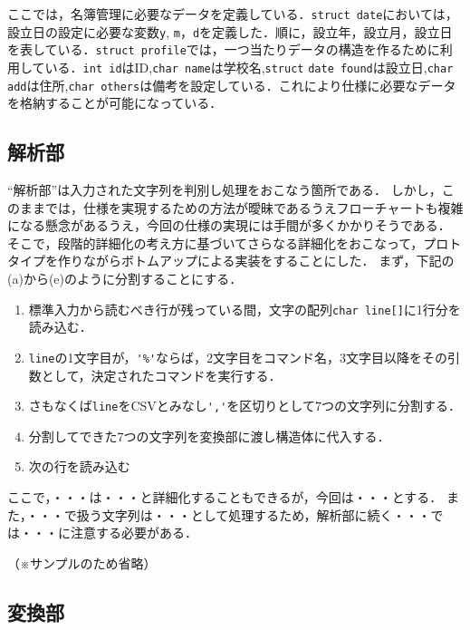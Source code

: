 \documentclass[a4j,11pt]{jarticle}
\begin{document}
ここでは，名簿管理に必要なデータを定義している．\verb|struct date|においては，設立日の設定に必要な変数\verb|y|, \verb|m|，\verb|d|を定義した．順に，設立年，設立月，設立日を表している．\verb|struct profile|では，一つ当たりデータの構造を作るために利用している．\verb|int id|はID,\verb|char name|は学校名,\verb|struct| \verb|date found|は設立日,\verb|char add|は住所,\verb|char others|は備考を設定している．これにより仕様に必要なデータを格納することが可能になっている．

\subsection{解析部} \label{sec:parse}

``解析部''は入力された文字列を判別し処理をおこなう箇所である．
しかし，このままでは，仕様を実現するための方法が曖昧であるうえフローチャートも複雑になる懸念があるうえ，今回の仕様の実現には手間が多くかかりそうである．
そこで，段階的詳細化の考え方に基づいてさらなる詳細化をおこなって，プロトタイプを作りながらボトムアップによる実装をすることにした．
まず，下記の(a)から(e)のように分割することにする．

\begin{enumerate}
\setlength{\parskip}{2pt} \setlength{\itemsep}{2pt}
\renewcommand{\labelenumi}{(\alph{enumi})} %
    \item 標準入力から読むべき行が残っている間，文字の配列\verb|char line[]|に1行分を読み込む．
    \item \verb|line|の1文字目が，\verb|'%'|ならば，2文字目をコマンド名，3文字目以降をその引数として，決定されたコマンドを実行する．
    \item さもなくば\verb|line|をCSVとみなし\verb|','|を区切りとして7つの文字列に分割する．
    \item 分割してできた7つの文字列を変換部に渡し構造体に代入する．
    \item 次の行を読み込む
\end{enumerate}

ここで，・・・は・・・と詳細化することもできるが，今回は・・・とする．
また，・・・で扱う文字列は・・・として処理するため，解析部に続く・・・では・・・に注意する必要がある．

（※サンプルのため省略）

\subsection{変換部} \label{sec:exchange}
\end{document}
